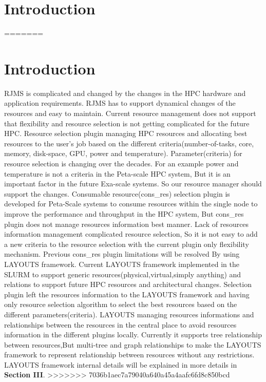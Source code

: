 \documentclass[conference]{IEEEtran}
\begin{document}
\section{Introduction}

=======
\section{Introduction}
RJMS is complicated and changed by the changes in the HPC hardware and application requirements. RJMS has to support dynamical changes of the resources and easy to maintain. Current resource management does not support that flexibility and resource selection is not getting complicated for the future HPC.  Resource selection plugin managing HPC resources and allocating best resources to the user's job based on the different criteria(number-of-tasks, core, memory, disk-space, GPU, power and temperature). Parameter(criteria) for resource selection is changing over the decades. For an example power and temperature is not a criteria in the Peta-scale HPC system, But it is an important factor in the future Exa-scale systems. So our resource manager should support the changes. Consumable resource(cons\_res) selection plugin is developed for Peta-Scale systems to consume resources within the single node to improve the performance and throughput in the HPC system, But cons\_res plugin does not manage resources information best manner. Lack of resources information management complicated resource selection, So it is not easy to add a new criteria to the resource selection with the current plugin only flexibility mechanism. Previous cons\_res plugin limitations will be resolved By using LAYOUTS framework. Current LAYOUTS framework implemented in the SLURM to support generic resources(physical,virtual,simply anything) and relations to support future HPC resources and architectural changes. Selection plugin left the resources information to the LAYOUTS framework and having only resource selection algorithm to select the best resources based on the different parameters(criteria). LAYOUTS managing resources informations and relationships between the resources in the central place to avoid resources information in the different plugins locally. Currently it supports tree relationship between resources,But multi-tree and graph relationships to make the LAYOUTS framework to represent relationship between resources without  any restrictions. LAYOUTS framework internal details will be explained in more details in \textbf{Section III}.
>>>>>>> 7036b1aec7a79040a640a45a4aafc6fd8c850bcd
\end{document}
